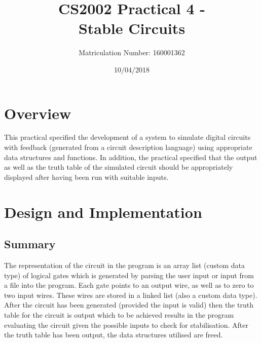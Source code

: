 \documentclass[11]{article}
\title{CS2002 Practical 4 - \\Stable Circuits}
\date{10/04/2018}
\author{Matriculation Number: 160001362}
\begin{document}
	
	\maketitle
	\newpage
	\tableofcontents
	
	\newpage
	\section{Overview}
	This practical specified the development of a system to simulate digital circuits with feedback (generated from a circuit description language) using appropriate data structures and functions. In addition, the practical specified that the output as well as the truth table of the simulated circuit should be appropriately displayed after having been run with suitable inputs.
	\section{Design and Implementation}
		\subsection{Summary}
			The representation of the circuit in the program is an array list (custom data type) of logical gates which is generated by parsing the user input or input from a file into the program. Each gate points to an output wire, as well as to zero to two input wires. These wires are stored in a linked list (also a custom data type). After the circuit has been generated (provided the input is valid) then the truth table for the circuit is output which to be achieved results in the program evaluating the circuit given the possible inputs to check for stabilisation. After the truth table has been output, the data structures utilised are freed.
\end{document}
